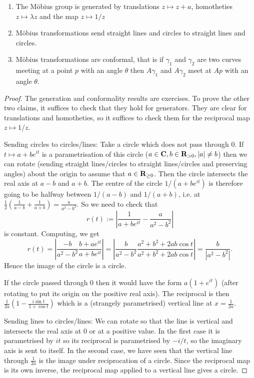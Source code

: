 \documentclass[12pt]{article}
\begin{document}
  \begin{thm}
    \begin{enumerate}
    \item The M\"obius group is generated by translations $z\mapsto z+a$, homotheties $z\mapsto\lambda z$ and the map $z\mapsto 1/z$
    \item M\"obius transformations send straight lines and circles to straight lines and circles.
    \item M\"obius transformations are conformal, that is if $\gamma_1$ and $\gamma_2$ are two curves meeting at a point $p$ with an angle $\theta$ then $A\gamma_1$ and $A\gamma_2$ meet at $Ap$ with an angle $\theta$.
    \end{enumerate}
  \end{thm}
  \begin{proof}
    The generation and conformality results are exercises. To prove the other two claims, it suffices to check that they hold for generators. They are clear for translations and homotheties, so it suffices to check them for the reciprocal map $z\mapsto 1/z$.

    Sending circles to circles/lines: Take a circle which does not pass through 0. If $t\mapsto a+be^{it}$ is a parametrisation of this circle ($a\in\mathbf{C},b\in\mathbf{R}_{>0},|a|\neq b$) then we can rotate (sending straight lines/circles to straight lines/circles and preserving angles) about the origin to assume that $a\in\mathbf{R}_{\geq 0}$. Then the circle intersects the real axis at $a-b$ and $a+b$. The centre of the circle $1/(a+be^{it})$ is therefore going to be halfway between $1/(a-b)$ and $1/(a+b)$, i.e. at $\frac{1}{2}\left(\frac{1}{a-b}+\frac{1}{a+b}\right)=\frac{a}{a^2-b^2}$. So we need to check that
    \[r(t):=\left|\frac{1}{a+be^{it}}-\frac{a}{a^2-b^2}\right|\]
    is constant. Computing, we get
    \[r(t)=\left|\frac{-b}{a^2-b^2}\frac{b+ae^{it}}{a+be^{it}}\right|=\left|\frac{b}{a^2-b^2}\frac{a^2+b^2+2ab\cos t}{a^2+b^2+2ab\cos t}\right|=\frac{b}{|a^2-b^2|}.\]
    Hence the image of the circle is a circle.

    If the circle passed through 0 then it would have the form $a(1+e^{it})$ (after rotating to put its origin on the positive real axis). The reciprocal is then $\frac{1}{2a}\left(1-\frac{i\sin t}{1+\cos t}\right)$ which is a (strangely parametrised) vertical line at $x=\frac{1}{2a}$.

    Sending lines to circles/lines: We can rotate so that the line is vertical and intersects the real axis at $0$ or at a positive value. In the first case it is parametrised by $it$ so its reciprocal is parametrised by $-i/t$, so the imaginary axis is sent to itself. In the second case, we have seen that the vertical line through $\frac{1}{2a}$ is the image under reciprocation of a circle. Since the reciprocal map is its own inverse, the reciprocal map applied to a vertical line gives a circle.
  \end{proof}
\end{document}
